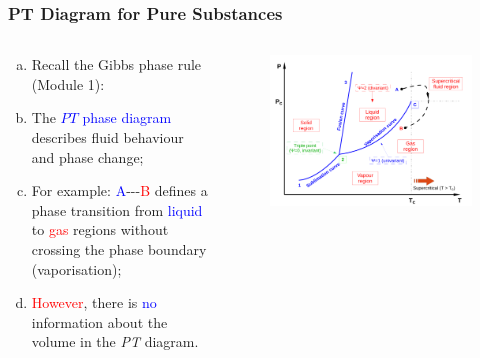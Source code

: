 \documentclass[10pt,compress]{beamer}
\begin{document}
\scriptsize
\begin{frame}
 \frametitle{PT Diagram for Pure Substances}
  \begin{columns}
    \begin{column}[l]{0.5\linewidth}\scriptsize
      \begin{enumerate}[(a)]%
        \item <1-> Recall the Gibbs phase rule (Module 1):
        \item<2-> The \textcolor{blue}{$PT$ phase diagram} describes fluid behaviour and phase change; 
        \item<3-> For example: \textcolor{blue}{A}-\;-\;-\textcolor{red}{B} defines a phase transition from \textcolor{blue}{liquid} to \textcolor{red}{gas} regions without crossing the phase boundary (vaporisation);
        \item<4-> \textcolor{red}{However}, there is \textcolor{blue}{no} information about the volume in the {\it PT} diagram.
      \end{enumerate}
    \end{column}
    \begin{column}[l]{0.5\linewidth}\scriptsize
      \begin{figure}%
        \begin{center}
          \includegraphics[width=1.05\columnwidth,clip]{./Pics/PT_Diagram}
        \end{center}
      \end{figure}
    \end{column}
  \end{columns}
\end{frame}
\normalsize
\end{document}
